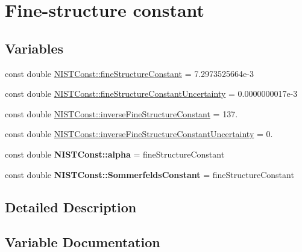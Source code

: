 \hypertarget{group___fine_structure_constant}{}\section{Fine-\/structure constant}
\label{group___fine_structure_constant}
\subsection*{Variables}
\begin{DoxyCompactItemize}
\item 
const double \hyperlink{group___fine_structure_constant_ga0f1ddaca2627b7253ed177aa1b074724}{N\+I\+S\+T\+Const\+::fine\+Structure\+Constant} = 7.\+2973525664e-\/3
\item 
const double \hyperlink{group___fine_structure_constant_ga18067d14fb16cc6418212812405e6496}{N\+I\+S\+T\+Const\+::fine\+Structure\+Constant\+Uncertainty} = 0.\+0000000017e-\/3
\item 
const double \hyperlink{group___fine_structure_constant_gaa4cd257f5376577cf0331e71dd952bb6}{N\+I\+S\+T\+Const\+::inverse\+Fine\+Structure\+Constant} = 137.
\item 
const double \hyperlink{group___fine_structure_constant_gae26a4808ef23039e47ea7fc6d971d420}{N\+I\+S\+T\+Const\+::inverse\+Fine\+Structure\+Constant\+Uncertainty} = 0.
\item 
\mbox{\label{group___fine_structure_constant_gac2d74edeb9ba449e5e687a2cdbb139e9}} 
const double {\bfseries N\+I\+S\+T\+Const\+::alpha} = fine\+Structure\+Constant
\item 
\mbox{\label{group___fine_structure_constant_gaa076e4b419cd726407c8e2e9a44a381b}} 
const double {\bfseries N\+I\+S\+T\+Const\+::\+Sommerfelds\+Constant} = fine\+Structure\+Constant
\end{DoxyCompactItemize}


\subsection{Detailed Description}


\subsection{Variable Documentation}
\mbox{\label{group___fine_structure_constant_ga0f1ddaca2627b7253ed177aa1b074724}} 
